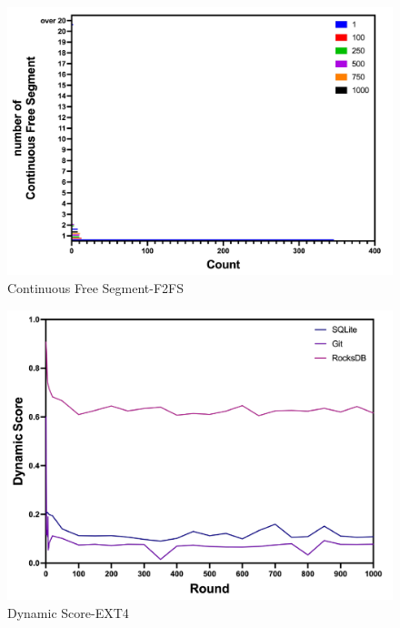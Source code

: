 \begin{figure}[t]
    \centering
	\includegraphics[width=0.95\columnwidth]{graphs/continuous_free_segment_fsfs}
	\caption{Continuous Free Segment-F2FS}
	\label{f:continuous_free_segment_fsfs}
\end{figure}

\begin{figure}[t]
    \centering
	\includegraphics[width=0.95\columnwidth]{graphs/ext4_dynamic}
	\caption{Dynamic Score-EXT4}
	\label{f:ext4_dynamic}
\end{figure}

